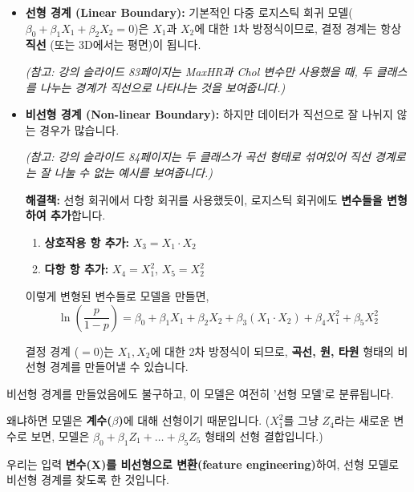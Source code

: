 \documentclass[11pt,a4paper]{book}
\theoremstyle{definition}
\begin{document}
\begin{itemize}
    \item \textbf{선형 경계 (Linear Boundary):}
    기본적인 다중 로지스틱 회귀 모델($\beta_0 + \beta_1 X_1 + \beta_2 X_2 = 0$)은 $X_1$과 $X_2$에 대한 1차 방정식이므로, 결정 경계는 항상 \textbf{직선} (또는 3D에서는 평면)이 됩니다.
    
        \begin{center}
        \textit{(참고: 강의 슬라이드 83페이지는 MaxHR과 Chol 변수만 사용했을 때, 두 클래스를 나누는 경계가 직선으로 나타나는 것을 보여줍니다.)}
    \end{center}

    \item \textbf{비선형 경계 (Non-linear Boundary):}
    하지만 데이터가 직선으로 잘 나뉘지 않는 경우가 많습니다.
    
        \begin{center}
        \textit{(참고: 강의 슬라이드 84페이지는 두 클래스가 곡선 형태로 섞여있어 직선 경계로는 잘 나눌 수 없는 예시를 보여줍니다.)}
    \end{center}

    \textbf{해결책:} 선형 회귀에서 다항 회귀를 사용했듯이, 로지스틱 회귀에도 \textbf{변수들을 변형하여 추가}합니다.
    
    \begin{enumerate}
        \item \textbf{상호작용 항 추가:} $X_3 = X_1 \cdot X_2$
        \item \textbf{다항 항 추가:} $X_4 = X_1^2$, $X_5 = X_2^2$
    \end{enumerate}

    이렇게 변형된 변수들로 모델을 만들면,
    $$ \ln\left( \frac{p}{1-p} \right) = \beta_0 + \beta_1 X_1 + \beta_2 X_2 + \beta_3 (X_1 \cdot X_2) + \beta_4 X_1^2 + \beta_5 X_2^2 $$
    
    결정 경계 ($= 0$)는 $X_1, X_2$에 대한 2차 방정식이 되므로, \textbf{곡선, 원, 타원} 형태의 비선형 경계를 만들어낼 수 있습니다.
\end{itemize}

\begin{warningbox}[title=모델은 여전히 '선형'입니다]
    비선형 경계를 만들었음에도 불구하고, 이 모델은 여전히 '선형 모델'로 분류됩니다.
    
    왜냐하면 모델은 \textbf{계수($\beta$)}에 대해 선형이기 때문입니다. ($X_1^2$를 그냥 $Z_4$라는 새로운 변수로 보면, 모델은 $\beta_0 + \beta_1 Z_1 + \dots + \beta_5 Z_5$ 형태의 선형 결합입니다.)
    
    우리는 입력 \textbf{변수(X)를 비선형으로 변환(feature engineering)}하여, 선형 모델로 비선형 경계를 찾도록 한 것입니다.
\end{warningbox}
\end{document}
